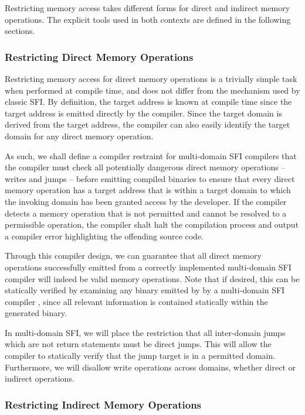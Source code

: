 \documentclass[12pt]{IEEEtran}
\begin{document}
Restricting memory access takes different forms for direct and indirect memory operations. The explicit tools used in both contexts are defined in the following sections.

\subsubsection{Restricting Direct Memory Operations}

Restricting memory access for direct memory operations is a trivially simple task when performed at compile time, and does not differ from the mechanism used by classic SFI. By definition, the target address is known at compile time since the target address is emitted directly by the compiler. Since the target domain is derived from the target address, the compiler can also easily identify the target domain for any direct memory operation.

As such, we shall define a compiler restraint for multi-domain SFI compilers that the compiler must check all potentially dangerous direct memory operations -- writes and jumps -- before emitting compiled binaries to ensure that every direct memory operation has a target address that is within a target domain to which the invoking domain has been granted access by the developer. If the compiler detects a memory operation that is not permitted and cannot be resolved to a permissible operation, the compiler shalt halt the compilation process and output a compiler error highlighting the offending source code.

Through this compiler design, we can guarantee that all direct memory operations successfully emitted from a correctly implemented multi-domain SFI compiler will indeed be valid memory operations. Note that if desired, this can be statically verified by examining any binary emitted by by a multi-domain SFI compiler \cite{yee_native_2009}, since all relevant information is contained statically within the generated binary.

In multi-domain SFI, we will place the restriction that all inter-domain jumps which are not return statements must be direct jumps. This will allow the compiler to statically verify that the jump target is in a permitted domain. Furthermore, we will disallow write operations across domains, whether direct or indirect operations.

\subsubsection{Restricting Indirect Memory Operations}
\end{document}
